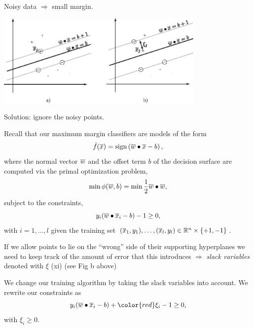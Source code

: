\documentclass[a4paper,blends,pdf,colorBG,slideColor]{prosper}
\begin{document}
Noisy data $\Rightarrow$ small margin.

\begin{center}
\includegraphics[width=4in]{figures/fig07-04.eps}
\end{center}

Solution: ignore the noisy points.
\es

Recall that our maximum margin classifiers are models of the form
\begin{equation*}
\model{f}(\ol{x}) = \sign\left ( \ol{w} \bullet \ol{x} - b \right ),
\end{equation*}
where the normal vector $\overline{w}$ and the offset term $b$
of the decision surface are computed via the primal optimization problem,
\begin{equation*}
\min \phi(\overline{w},b)  =  \min \frac{1}{2}\overline{w}\bullet\overline{w},
\end{equation*}
subject to the constraints,
\begin{equation*}
y_i(\overline{w}\bullet\overline{x}_i-b) - 1\ge 0,
\end{equation*}
with $i = 1,\ldots, l$ given the training set $(\overline{x}_1,y_1),\ldots,(\overline{x}_l,y_l) \in \mathbb{R}^{n}\times \{+1,-1\}$.
\es

\small
If we allow points to lie on the ``wrong'' side of their supporting hyperplanes we need to
keep track  of the amount of error that this introduces $\Rightarrow$ {\em slack variables} 
denoted with $\xi$ (xi) (see Fig b above)

We change our  training algorithm by taking the slack variables into account.  We rewrite our
constraints as
\begin{equation*}
y_i(\ol{w}\bullet\ol{x}_i-b) + {\color{red}\xi_i} - 1 \ge 0,
\end{equation*}
with $\xi_i \ge 0$.
\end{document}
